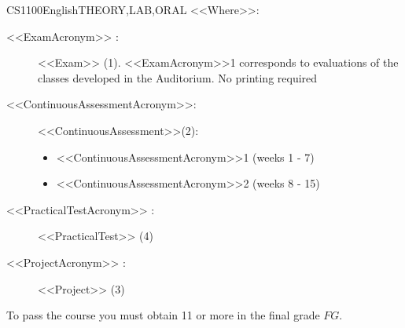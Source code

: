 \begin{evaluation}{CS1100}{English}{THEORY,LAB,ORAL}
\vspace{2mm}
\noindent <<Where>>:
\begin{description}
    \item[<<ExamAcronym>> :] <<Exam>> (1). <<ExamAcronym>>1 corresponds to evaluations of the classes developed in the Auditorium. No printing required
    \item[<<ContinuousAssessmentAcronym>>:]<<ContinuousAssessment>>(2):
    \begin{itemize}
            \item <<ContinuousAssessmentAcronym>>1 (weeks 1 - 7) 
            \item <<ContinuousAssessmentAcronym>>2 (weeks 8 - 15)
    \end{itemize}
    \item[<<PracticalTestAcronym>> :] <<PracticalTest>>  (4)
    \item[<<ProjectAcronym>> :] <<Project>> (3)
\end{description}

\noindent To pass the course you must obtain 11 or more in the final grade $FG$.
\end{evaluation}
  

